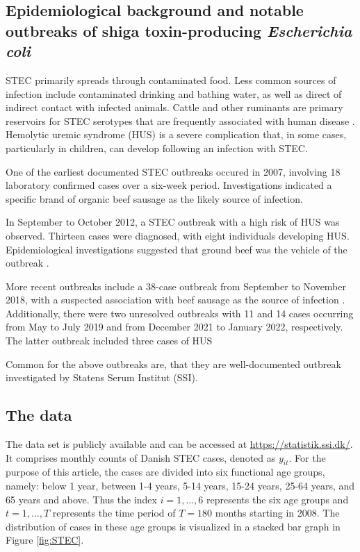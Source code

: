 \documentclass[preprint, 3p, authoryear]{elsarticle} %
\begin{document}
\hypertarget{epidemiological-background-and-notable-outbreaks-of-shiga-toxin-producing-escherichia-coli}{%
\subsection{\texorpdfstring{Epidemiological background and notable outbreaks of shiga toxin-producing \emph{Escherichia coli}}{Epidemiological background and notable outbreaks of shiga toxin-producing Escherichia coli}}\label{epidemiological-background-and-notable-outbreaks-of-shiga-toxin-producing-escherichia-coli}}

STEC primarily spreads through contaminated food. Less common sources of infection include contaminated drinking and bathing water, as well as direct of indirect contact with infected animals. Cattle and other ruminants are primary reservoirs for STEC serotypes that are frequently associated with human disease \citep{Menge_2020}. Hemolytic uremic syndrome (HUS) is a severe complication that, in some cases, particularly in children, can develop following an infection with STEC.

One of the earliest documented STEC outbreaks occured in 2007, involving 18 laboratory confirmed cases over a six-week period. Investigations indicated a specific brand of organic beef sausage as the likely source of infection.

In September to October 2012, a STEC outbreak with a high risk of HUS was observed. Thirteen cases were diagnosed, with eight individuals developing HUS. Epidemiological investigations suggested that ground beef was the vehicle of the outbreak \citep[\citet{Helwigh_2013}]{Soborg_2013}.

More recent outbreaks include a 38-case outbreak from September to November 2018, with a suspected association with beef sausage as the source of infection \citep{Helwigh_2019}. Additionally, there were two unresolved outbreaks with 11 and 14 cases occurring from May to July 2019 and from December 2021 to January 2022, respectively. The latter outbreak included three cases of HUS

Common for the above outbreaks are, that they are well-documented outbreak investigated by Statens Serum Institut (SSI).

\hypertarget{the-data}{%
\subsection{The data}\label{the-data}}

The data set is publicly available and can be accessed at \url{https://statistik.ssi.dk/}. It comprises monthly counts of Danish STEC cases, denoted as \(y_{it}\). For the purpose of this article, the cases are divided into six functional age groups, namely: below 1 year, between 1-4 years, 5-14 years, 15-24 years, 25-64 years, and 65 years and above. Thus the index \(i=1,\dots,6\) represents the six age groups and \(t=1,\dots,T\) represents the time period of \(T=180\) months starting in 2008. The distribution of cases in these age groups is visualized in a stacked bar graph in Figure \ref{fig:STEC}.
\end{document}
